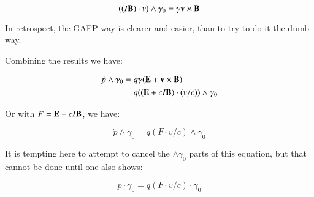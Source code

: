 \documentclass{article}
\begin{document}
\begin{equation*}
((I\mathbf{B}) \cdot v) \wedge \gamma_0 = \gamma \mathbf{v} \times \mathbf{B}
\end{equation*}

In retrospect, the GAFP way is clearer and easier, than to try to do it the dumb way.

Combining the results we have:

\begin{align*}
\dot{p} \wedge \gamma_0 
&= q \gamma ( \mathbf{E} + \mathbf{v} \times \mathbf{B} ) \\
&= q (( \mathbf{E} + c I \mathbf{B} ) \cdot (v/c)) \wedge \gamma_0 \\
\end{align*}

Or with $F = \mathbf{E} + c I \mathbf{B}$, we have:

\begin{equation}
\dot{p} \wedge \gamma_0 = q ( F \cdot v/c ) \wedge \gamma_0
\end{equation}

It is tempting here to attempt to cancel the $\wedge \gamma_0$ parts of this equation, but that cannot be done
until one also shows:

\begin{equation*}
\dot{p} \cdot \gamma_0 = q ( F \cdot v/c ) \cdot \gamma_0
\end{equation*}
\end{document}
